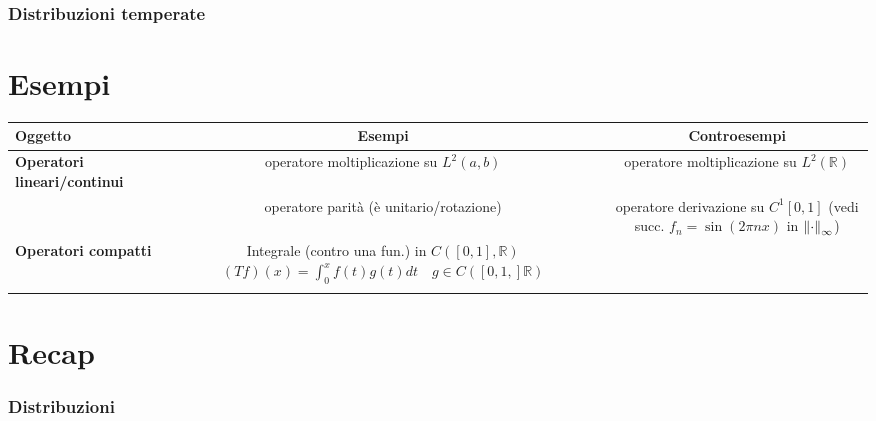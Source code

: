 \documentclass[a4paper,10pt]{article}
\theoremstyle{definition}
\newcommand{\re}{\mathbb{R}} %
\theoremstyle{indentdefinition}
\theoremstyle{indenttheorem}
\theoremstyle{myremark}
\theoremstyle{indentgeneral}
\begin{document}
\section{Distribuzioni temperate}

\pagebreak
\part{Esempi}
\begin{table}[h]
    \centering
    \begin{tabular}{l|c|c}
         \textbf{Oggetto}&  \textbf{Esempi}& \textbf{Controesempi}\\ \hline
        \textbf{Operatori lineari/continui} & operatore moltiplicazione su $L^2(a,b)$ &operatore moltiplicazione su $L^2(\re)$ \\
        & operatore parità (è unitario/rotazione) & \shortstack{operatore derivazione su $C^1[0,1]$ \\ (vedi succ. $f_n=\sin(2\pi nx)$ in $\norm{\cdot}_\infty$)} \\\hline
        \textbf{Operatori compatti} & \shortstack{Integrale (contro una fun.) in $C([0,1],\re)$ \\
        $ (Tf)(x)=\int_{0}^{x}f(t)g(t)dt\quad g\in C([0,1,]\re)$}& \\
         &  & \\
    \end{tabular}

    

\end{table}

\pagebreak
\part{Recap}
\section{Distribuzioni}
\end{document}

